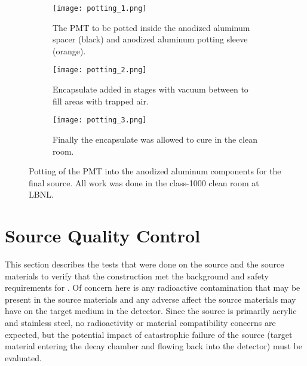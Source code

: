 \begin{figure}
\begin{subfigure}[t]{.36\textwidth}
\texttt{[image: potting\_1.png]}
\caption{The PMT to be potted inside the anodized aluminum spacer (black) and anodized aluminum potting sleeve (orange).}
\label{fig:potting_a}
\end{subfigure}
\hfill
\begin{subfigure}[t]{.29\textwidth}
\texttt{[image: potting\_2.png]}
\caption{Encapsulate added in stages with vacuum between to fill areas with trapped air.}
\label{fig:potting_b}
\end{subfigure}
\hfill
\begin{subfigure}[t]{.27\textwidth}
\texttt{[image: potting\_3.png]}
\caption{Finally the encapsulate was allowed to cure in the clean room.}
\label{fig:potting_c}
\end{subfigure}
\caption{Potting of the PMT into the anodized aluminum components for the final source. All work was done in the class-1000 clean room at LBNL.}
\label{fig:potting}
\end{figure}

\section{Source Quality Control}
\label{chap:tests}

This section describes the tests that were done on the source and the source materials to verify that the construction met the background and safety requirements for {\snop}. 
Of concern here is any radioactive contamination that may be present in the source materials and any adverse affect the source materials may have on the target medium in the detector.
Since the source is primarily acrylic and stainless steel, no radioactivity or material compatibility concerns are expected, but the potential impact of catastrophic failure of the source (target material entering the decay chamber and flowing back into the detector) must be evaluated.

